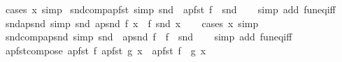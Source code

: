 \begin{isabellebody}
%
\isatagproof
{}\isamarkupfalse%
\ {\isacharparenleft}{\kern0pt}cases\ x{\isacharparenright}{\kern0pt}\ simp%
\endisatagproof
{\isafoldproof}%
%
\isadelimproof
\isanewline
%
\endisadelimproof
\isanewline
{}\isamarkupfalse%
\ snd{\isacharunderscore}{\kern0pt}comp{\isacharunderscore}{\kern0pt}apfst\ {\isacharbrackleft}{\kern0pt}simp{\isacharbrackright}{\kern0pt}{\isacharcolon}{\kern0pt}\ {\isachardoublequoteopen}snd\ {\isasymcirc}\ apfst\ f\ {\isacharequal}{\kern0pt}\ snd{\isachardoublequoteclose}\isanewline
%
\isadelimproof
\ \ %
\endisadelimproof
%
\isatagproof
{}\isamarkupfalse%
\ {\isacharparenleft}{\kern0pt}simp\ add{\isacharcolon}{\kern0pt}\ fun{\isacharunderscore}{\kern0pt}eq{\isacharunderscore}{\kern0pt}iff{\isacharparenright}{\kern0pt}%
\endisatagproof
{\isafoldproof}%
%
\isadelimproof
\isanewline
%
\endisadelimproof
\isanewline
{}\isamarkupfalse%
\ snd{\isacharunderscore}{\kern0pt}apsnd\ {\isacharbrackleft}{\kern0pt}simp{\isacharbrackright}{\kern0pt}{\isacharcolon}{\kern0pt}\ {\isachardoublequoteopen}snd\ {\isacharparenleft}{\kern0pt}apsnd\ f\ x{\isacharparenright}{\kern0pt}\ {\isacharequal}{\kern0pt}\ f\ {\isacharparenleft}{\kern0pt}snd\ x{\isacharparenright}{\kern0pt}{\isachardoublequoteclose}\isanewline
%
\isadelimproof
\ \ %
\endisadelimproof
%
\isatagproof
{}\isamarkupfalse%
\ {\isacharparenleft}{\kern0pt}cases\ x{\isacharparenright}{\kern0pt}\ simp%
\endisatagproof
{\isafoldproof}%
%
\isadelimproof
\isanewline
%
\endisadelimproof
\isanewline
{}\isamarkupfalse%
\ snd{\isacharunderscore}{\kern0pt}comp{\isacharunderscore}{\kern0pt}apsnd\ {\isacharbrackleft}{\kern0pt}simp{\isacharbrackright}{\kern0pt}{\isacharcolon}{\kern0pt}\ {\isachardoublequoteopen}snd\ {\isasymcirc}\ apsnd\ f\ {\isacharequal}{\kern0pt}\ f\ {\isasymcirc}\ snd{\isachardoublequoteclose}\isanewline
%
\isadelimproof
\ \ %
\endisadelimproof
%
\isatagproof
{}\isamarkupfalse%
\ {\isacharparenleft}{\kern0pt}simp\ add{\isacharcolon}{\kern0pt}\ fun{\isacharunderscore}{\kern0pt}eq{\isacharunderscore}{\kern0pt}iff{\isacharparenright}{\kern0pt}%
\endisatagproof
{\isafoldproof}%
%
\isadelimproof
\isanewline
%
\endisadelimproof
\isanewline
{}\isamarkupfalse%
\ apfst{\isacharunderscore}{\kern0pt}compose{\isacharcolon}{\kern0pt}\ {\isachardoublequoteopen}apfst\ f\ {\isacharparenleft}{\kern0pt}apfst\ g\ x{\isacharparenright}{\kern0pt}\ {\isacharequal}{\kern0pt}\ apfst\ {\isacharparenleft}{\kern0pt}f\ {\isasymcirc}\ g{\isacharparenright}{\kern0pt}\ x{\isachardoublequoteclose}\isanewline

\end{isabellebody}

